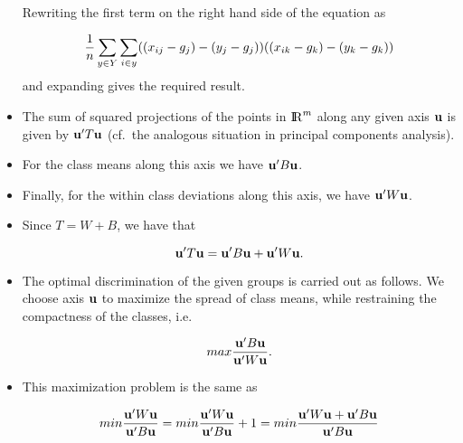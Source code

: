 \documentclass[a4,dvips]{seminar}
\def\real{{\rm I \kern-0.2em R}}       %
\begin{document}
\begin{slide}
\begin{itemize}
Rewriting the first term on the right hand side of the equation as

$$ {1 \over n} \sum_{y \in Y} \sum_{i \in y} ((x_{ij} - g_{j}) -
    (y_{j} - g_{j}))((x_{ik} - g_{k}) - (y_{k} - g_{k})) $$ and 
expanding gives the required result.
\item 
The sum of squared projections of the points in $ \real^m $ along any given 
axis ${\bf u}$ is
given by $ {\bf u}^\prime T {\bf u} $ (cf.\ the analogous situation in 
principal components analysis). 
\item For the class means along this 
axis we have $ {\bf u}^\prime B {\bf u} $.  
\item Finally, for the 
within class deviations along this axis, we have $ {\bf u}^\prime W {\bf u} $. 
\item Since
$ T = W + B $, we have that

$$  {\bf u}^\prime T {\bf u}  =  {\bf u}^\prime B {\bf u} 
                                +  {\bf u}^\prime W {\bf u}. $$

\item The optimal discrimination of the given groups is carried out as follows.
We choose axis ${\bf u}$ to maximize the spread of class means, while
restraining the compactness of the classes, i.e.

$$ {\sl max} {{{\bf u}^\prime B {\bf u}} \over {{\bf u}^\prime W {\bf u}}}. $$
\item This maximization problem is the same as

$$ {\sl min} {{{\bf u}^\prime W {\bf u}} \over {{\bf u}^\prime B {\bf u}}} 
 = {\sl min} {{{\bf u}^\prime W {\bf u}} \over {{\bf u}^\prime B {\bf u}}} 
                                                                   + 1
 = {\sl min} {{{\bf u}^\prime W {\bf u} + {\bf u}^\prime B {\bf u}} 
                        \over {{\bf u}^\prime B {\bf u}}} $$


\end{itemize}
\end{slide}
\end{document}
